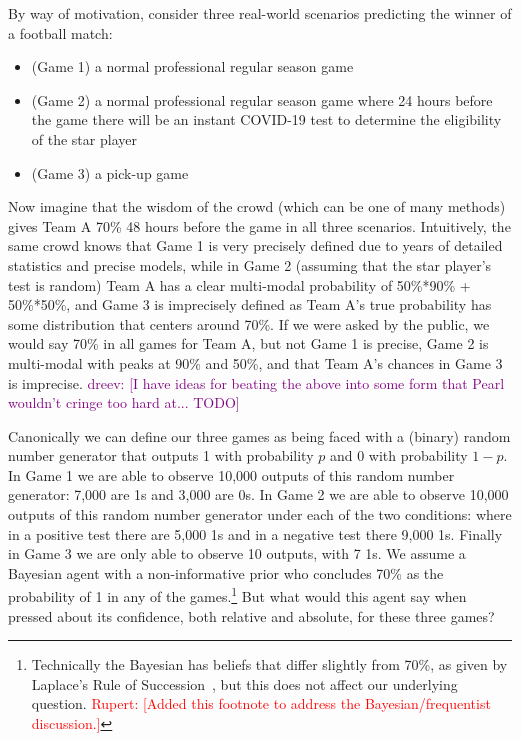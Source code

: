 \documentclass[sigconf,anonymous]{aamas}   %
\newcommand{\rupert}[1]{\ifnum\Chatty=1 \textcolor{red}   {Rupert: [#1]} \fi}
\newcommand{\dreev} [1]{\ifnum\Chatty=1 \textcolor{purple}{dreev:  [#1]} \fi}
\begin{document}
By way of motivation, consider three real-world scenarios predicting the winner of a football match:
\begin{itemize}
\item (Game 1) a normal professional regular season game 
\item (Game 2) a normal professional regular season game where 24 hours before the game there will be an instant COVID-19 test to determine the eligibility of the star player 
\item (Game 3) a pick-up game
\end{itemize}
Now imagine that the wisdom of the crowd (which can be one of many methods) gives Team A 70\% 48 hours before the game in all three scenarios. 
Intuitively, the same crowd knows that Game 1 is very precisely defined due to years of detailed statistics and precise models, while in Game 2 (assuming that the star player's test is random) Team A has a clear multi-modal probability of 50\%*90\% + 50\%*50\%, and Game 3 is imprecisely defined as Team A's true probability has some distribution that centers around 70\%. 
If we were asked by the public, we would say 70\% in all games for Team A, but not Game 1 is precise, Game 2 is multi-modal with peaks at 90\% and 50\%, and that Team A's chances in Game 3 is imprecise.
\dreev{I have ideas for beating the above into some form that Pearl wouldn't cringe too hard at... TODO}

Canonically we can define our three games as being faced with a (binary) random number generator that outputs 1 with probability $p$ and 0 with probability $1-p$. 
In Game 1 we are able to observe 10,000 outputs of this random number generator: 7,000 are 1s and 3,000 are 0s. 
In Game 2 we are able to observe 10,000 outputs of this random number generator under each of the two conditions: where in a positive test there are 5,000 1s and in a negative test there 9,000 1s. 
Finally in Game 3 we are only able to observe 10 outputs, with 7 1s. 
We assume a Bayesian agent with a non-informative prior who concludes 70\% as the probability of 1 in any of the games.\footnote{Technically the Bayesian has beliefs that differ slightly from 70\%, as given by Laplace's Rule of Succession~\cite{de1840essai}, but this does not affect our underlying question.\rupert{Added this footnote to address the Bayesian/frequentist discussion.}} 
But what would this agent say when pressed about its confidence, both relative and absolute, for these three games?

\end{document}
